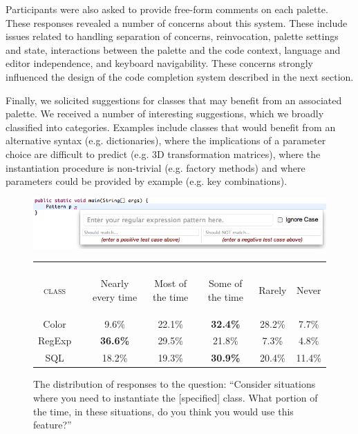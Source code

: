\documentclass[conference]{IEEEtran}
\begin{document}
Participants were also asked to provide free-form comments on each palette. These responses revealed a number of concerns about this system. These include issues related to handling separation of concerns, reinvocation, palette settings and state, interactions between the palette and the code context, language and editor independence, and keyboard navigability. These concerns strongly influenced the design of the code completion system described in the next section.

Finally, we solicited suggestions for classes that may benefit from an associated palette. We received a number of interesting suggestions, which we broadly classified into categories. Examples include classes that would benefit from an alternative syntax (e.g. dictionaries), where the implications of a parameter choice are difficult to predict (e.g. 3D transformation matrices), where the instantiation procedure is non-trivial (e.g. factory methods) and where parameters could be provided by example (e.g. key combinations).
\begin{figure}\begin{center}
  \includegraphics[scale=.4]{regex.png}\end{center}
  \vspace{-15pt}
  \end{figure}

\begin{figure}
\begin{tabular}{crccccc}\\\\
\textsc{class}
& 
& \begin{rotate}{20}Nearly every time\end{rotate}
& \begin{rotate}{20}Most of the time\end{rotate}
& \begin{rotate}{20}Some of the time\end{rotate}
& \begin{rotate}{20}Rarely\end{rotate}
& \begin{turn}{20}Never\end{turn}\\
\hline
Color &\vline& 9.6\% & 22.1\% & \textbf{32.4\%} & 28.2\% & 7.7\%\\
RegExp &\vline& \textbf{36.6\%} & 29.5\% & 21.8\% & 7.3\% & 4.8\%\\
SQL & \vline &18.2\% & 19.3\% & \textbf{30.9\%} & 20.4\% & 11.4\%\\
\hline
\end{tabular}
\caption{The distribution of responses to the question: ``Consider situations where you need to instantiate the [specified] class. What portion of the time, in these situations, do you think you would use this feature?''}
  \vspace{-15pt}

\end{figure}
\end{document}
